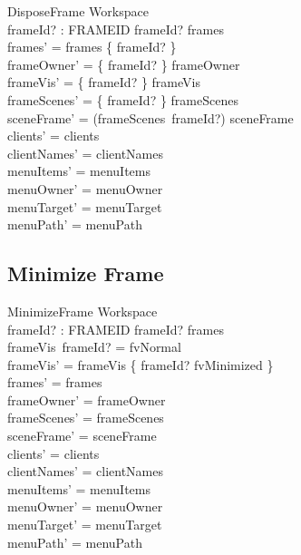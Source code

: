 \documentclass[a4paper,10pt,fleqn]{article}
\begin{document}
\begin{schema}{DisposeFrame}
  \Delta Workspace \\
  frameId? : FRAMEID
  \where
  frameId? \in frames \\
  frames' = frames \setminus \{ frameId? \} \\
  frameOwner' = \{ frameId? \} \ndres frameOwner \\
  frameVis' = \{ frameId? \} \ndres frameVis \\
  frameScenes' = \{ frameId? \} \ndres frameScenes \\
  sceneFrame' = (frameScenes~frameId?) \ndres sceneFrame \\
  clients' = clients \\
  clientNames' = clientNames \\
  menuItems' = menuItems \\
  menuOwner' = menuOwner \\
  menuTarget' = menuTarget \\
  menuPath' = menuPath
\end{schema}

\subsection{Minimize Frame}

\begin{schema}{MinimizeFrame}
  \Delta Workspace \\
  frameId? : FRAMEID
  \where
  frameId? \in frames \\
  frameVis~frameId? = fvNormal \\
  frameVis' = frameVis \oplus \{ frameId? \mapsto fvMinimized \} \\
  frames' = frames \\
  frameOwner' = frameOwner \\
  frameScenes' = frameScenes \\
  sceneFrame' = sceneFrame \\
  clients' = clients \\
  clientNames' = clientNames \\
  menuItems' = menuItems \\
  menuOwner' = menuOwner \\
  menuTarget' = menuTarget \\
  menuPath' = menuPath
\end{schema}
\end{document}
